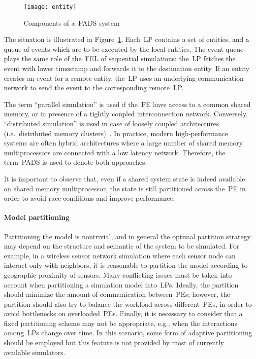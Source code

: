 \documentclass{sigplanconf}
\begin{document}
\begin{figure}[t]
\centering\texttt{[image: entity]}
\caption{Components of a~\ac{PADS} system}\label{fig:pads}
\end{figure}

The situation is illustrated in Figure~\ref{fig:pads}. Each~\ac{LP}
contains a set of entities, and a queue of events which are to be
executed by the local entities. The event queue plays the same role of
the~\ac{FEL} of sequential simulations: the~\ac{LP} fetches the event
with lower timestamp and forwards it to the destination entity. If an
entity creates an event for a remote entity, the~\ac{LP} uses an
underlying communication network to send the event to the
corresponding remote~\ac{LP}.

The term ``parallel simulation'' is used if the~\ac{PE} have access to
a common shared memory, or in presence of a tightly coupled
interconnection network. Conversely, ``distributed simulation'' is
used in case of loosely coupled architectures (i.e.~distributed memory
clusters)~\cite{perumalla2007}. In practice, modern high-performance
systems are often hybrid architectures where a large number of
shared memory multiprocessors are connected with a low latency
network. Therefore, the term~\ac{PADS} is used to denote both
approaches.

It is important to observe that, even if a shared system state is
indeed available on shared memory multiprocessor, the state is still
partitioned across the~\ac{PE} in order to avoid race conditions and
improve performance.

\paragraph*{Model partitioning} 
Partitioning the model is nontrivial, and in general the optimal
partition strategy may depend on the structure and semantic of the
system to be simulated. For example, in a wireless sensor network
simulation where each sensor node can interact only with neighbors, it
is reasonable to partition the model according to geographic proximity
of sensors. Many conflicting issues must be taken into account when
partitioning a simulation model into~\acp{LP}. Ideally, the partition
should minimize the amount of communication between~\acp{PE}; however,
the partition should also try to balance the workload across
different~\acp{PE}, in order to avoid bottlenecks on
overloaded~\acp{PE}. Finally, it is necessary to consider that a fixed
partitioning scheme may not be appropriate, e.g., when the
interactions among~\acp{LP} change over time. In this scenario, some
form of adaptive partitioning should be employed but this feature is not
provided by most of currently available simulators.
\end{document}
